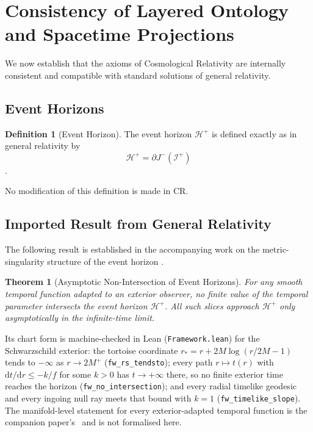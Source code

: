 \documentclass[11pt,a4paper]{article}
\theoremstyle{plain}
\newtheorem{theorem}{Theorem}
\theoremstyle{definition}
\newtheorem{definition}{Definition}
\theoremstyle{remark}
\newcommand{\dd}{\mathrm{d}}
\begin{document}
\section{Consistency of Layered Ontology and Spacetime Projections}\label{sec:CR-consistency}

We now establish that the axioms of Cosmological Relativity are internally consistent and compatible with standard solutions of general relativity.

\subsection{Event Horizons}

\begin{definition}[Event Horizon]
The event horizon $\mathcal{H}^+$ is defined exactly as in general relativity by
\[
\mathcal{H}^+ = \partial J^{-}(\mathcal{I}^+)
\]
\cite{Hawking1971}.\end{definition}

No modification of this definition is made in CR.

\subsection{Imported Result from General Relativity}

The following result is established in the accompanying work on the metric-singularity structure of the event horizon \cite{JanzenBHcausality}.

\begin{theorem}[Asymptotic Non-Intersection of Event Horizons]
For any smooth temporal function adapted to an exterior observer, no finite value of the temporal parameter intersects the event horizon $\mathcal{H}^+$. All such slices approach $\mathcal{H}^+$ only asymptotically in the infinite-time limit.
\end{theorem}

\noindent Its chart form is machine-checked in Lean (\texttt{Framework.lean}) for the Schwarzschild exterior: the tortoise coordinate $r_{*}=r+2M\log(r/2M-1)$ tends to $-\infty$ as $r\to2M^{+}$ (\texttt{fw\_rs\_tendsto}); every path $r\mapsto t(r)$ with $\dd t/\dd r\le-k/f$ for some $k>0$ has $t\to+\infty$ there, so no finite exterior time reaches the horizon (\texttt{fw\_no\_intersection}); and every radial timelike geodesic and every ingoing null ray meets that bound with $k=1$ (\texttt{fw\_timelike\_slope}). The manifold-level statement for every exterior-adapted temporal function is the companion paper's~\cite{JanzenBHcausality} and is not formalised here.
\end{document}

